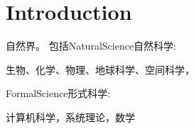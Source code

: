 

\chapter{Introduction}

自然界。
包括NaturalScience自然科学:

生物、化学、物理、地球科学、空间科学，



FormalScience形式科学:

计算机科学，系统理论，数学


